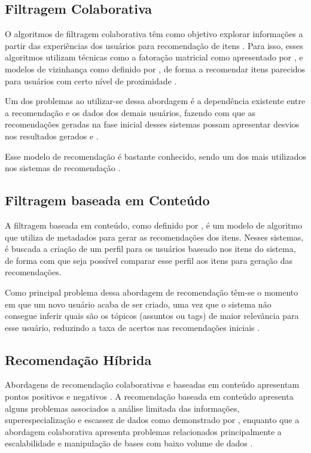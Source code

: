 \subsection{Filtragem Colaborativa}

O algoritmos de filtragem colaborativa têm como objetivo explorar informações a partir das experiências dos usuários para recomendação de itens \cite{sedhain2015}. Para isso, esses algoritmos utilizam técnicas como a fatoração matricial como apresentado por ,  e modelos de vizinhança como definido por , de forma a recomendar itens parecidos para usuários com certo nível de proximidade \cite{kimfalk2019}.

Um dos problemas ao utilizar-se dessa abordagem é a dependência existente entre a recomendação e os dados dos demais usuários, fazendo com que as recomendações geradas na fase inicial desses sistemas possam apresentar desvios nos resultados gerados  e \cite{choi2010content}.

Esse modelo de recomendação é bastante conhecido, sendo um dos mais utilizados nos sistemas de recomendação \cite{alyari2018}.

\subsection{Filtragem baseada em Conteúdo}

A filtragem baseada em conteúdo, como definido por , é um modelo de algoritmo que utiliza de metadados para gerar as recomendações dos itens. Nesses sistemas, é buscada a criação de um perfil para os usuários baseado nos itens do sistema, de forma com que seja possível comparar esse perfil aos itens para geração das recomendações.

Como principal problema dessa abordagem de recomendação têm-se o momento em que um novo usuário acaba de ser criado, uma vez que o sistema não consegue inferir quais são os tópicos (assuntos ou tags) de maior relevância para esse usuário, reduzindo a taxa de acertos nas recomendações iniciais \cite{inbook}.

\subsection{Recomendação Híbrida}

Abordagens de recomendação colaborativas e baseadas em conteúdo apresentam pontos positivos e negativos \cite{kimfalk2019}. A recomendação baseada em conteúdo apresenta alguns problemas associados a análise limitada das informações, superespecialização e escassez de dados como demonstrado por , enquanto que a abordagem colaborativa apresenta problemas relacionados principalmente a escalabilidade e manipulação de bases com baixo volume de dados \cite{isinkaye2015}.

